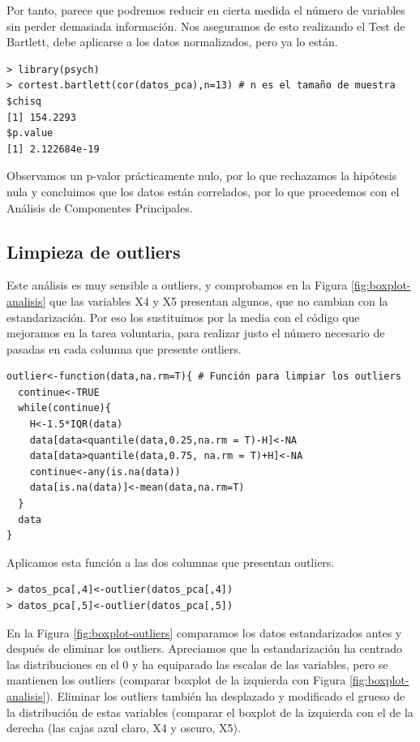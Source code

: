 \documentclass[12pt]{article}
\begin{document}
Por tanto, parece que podremos reducir en cierta medida el número de
variables sin perder demasiada información. Nos aseguramos de esto
realizando el Test de Bartlett, debe aplicarse a los datos
normalizados, pero ya lo están.

\begin{verbatim}
> library(psych)
> cortest.bartlett(cor(datos_pca),n=13) # n es el tamaño de muestra
$chisq
[1] 154.2293
$p.value
[1] 2.122684e-19
\end{verbatim}

Observamos un p-valor prácticamente nulo, por lo que rechazamos la
hipótesis nula y concluimos que los datos están correlados, por lo que
procedemos con el Análisis de Componentes Principales.
\subsection{Limpieza de outliers}
Este análisis es muy sensible a outliers, y comprobamos en la Figura
\ref{fig:boxplot-analisis} que las variables X4 y X5 presentan
algunos, que no cambian con la estandarización. Por eso los
sustituimos por la media con el código que mejoramos en la tarea
voluntaria, para realizar justo el número necesario de pasadas en cada
columna que presente outliers.

\begin{verbatim}
outlier<-function(data,na.rm=T){ # Función para limpiar los outliers
  continue<-TRUE
  while(continue){
    H<-1.5*IQR(data)
    data[data<quantile(data,0.25,na.rm = T)-H]<-NA
    data[data>quantile(data,0.75, na.rm = T)+H]<-NA
    continue<-any(is.na(data))
    data[is.na(data)]<-mean(data,na.rm=T)
  }
  data
}
\end{verbatim}
Aplicamos esta función a las dos columnas que presentan outliers.
\begin{verbatim}
> datos_pca[,4]<-outlier(datos_pca[,4])
> datos_pca[,5]<-outlier(datos_pca[,5])
\end{verbatim}

En la Figura \ref{fig:boxplot-outliers} comparamos los datos
estandarizados antes y después de eliminar los outliers. Apreciamos
que la estandarización ha centrado las distribuciones en el 0 y ha
equiparado las escalas de las variables, pero se mantienen los
outliers (comparar boxplot de la izquierda con Figura
\ref{fig:boxplot-analisis}). Eliminar los outliers también ha
desplazado y modificado el grueso de la distribución de estas
variables (comparar el boxplot de la izquierda con el de la derecha
(las cajas azul claro, X4 y oscuro, X5).
\end{document}
